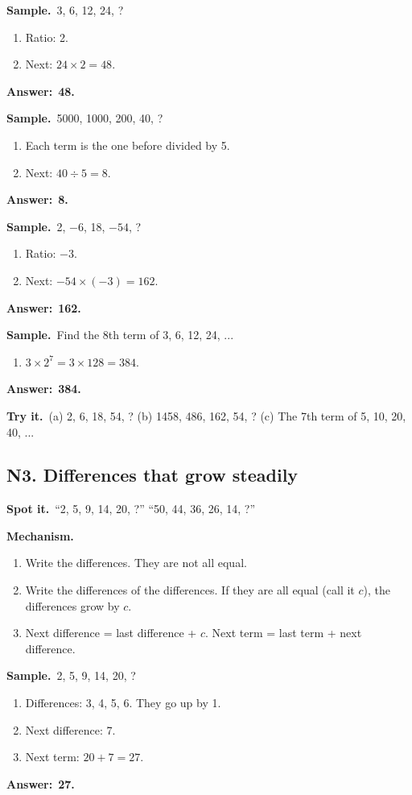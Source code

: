 \documentclass[11pt,a4paper]{article}
\let\oldsubsection\subsection
\renewcommand{\subsection}{\needspace{9\baselineskip}\oldsubsection}
\newcommand{\spot}{\textbf{\color{ember}Spot it.}\ }
\newcommand{\mech}{\textbf{\color{ember}Mechanism.}\ }
\newif\ifkeepsamp
\newcommand{\ans}[1]{\par\nopagebreak\noindent\textbf{\color{ember}Answer:}\ \textbf{#1}\par}
\newcommand{\samp}{\ifkeepsamp\needspace{4\baselineskip}\fi\textbf{\color{ember}Sample.}\ }
\newcommand{\tryit}[1]{\textbf{\color{ember}Try it.}\ #1}
\begin{document}
\samp 3, 6, 12, 24, ?
\begin{enumerate}
\item Ratio: 2.
\item Next: $24 \times 2 = 48$.
\end{enumerate}
\ans{48.}

\samp 5000, 1000, 200, 40, ?
\begin{enumerate}
\item Each term is the one before divided by 5.
\item Next: $40 \div 5 = 8$.
\end{enumerate}
\ans{8.}

\samp 2, $-6$, 18, $-54$, ?
\begin{enumerate}
\item Ratio: $-3$.
\item Next: $-54 \times (-3) = 162$.
\end{enumerate}
\ans{162.}

\samp Find the 8th term of 3, 6, 12, 24, ...
\begin{enumerate}
\item $3 \times 2^{7} = 3 \times 128 = 384$.
\end{enumerate}
\ans{384.}

\tryit (a) 2, 6, 18, 54, ? (b) 1458, 486, 162, 54, ? (c) The 7th term of 5, 10, 20, 40, ...

\subsection{N3. Differences that grow steadily}
\spot ``2, 5, 9, 14, 20, ?'' ``50, 44, 36, 26, 14, ?''

\mech
\begin{enumerate}
\item Write the differences. They are not all equal.
\item Write the differences of the differences. If they are all equal (call it $c$), the differences grow by $c$.
\item Next difference = last difference + $c$. Next term = last term + next difference.
\end{enumerate}

\samp 2, 5, 9, 14, 20, ?
\begin{enumerate}
\item Differences: 3, 4, 5, 6. They go up by 1.
\item Next difference: 7.
\item Next term: $20 + 7 = 27$.
\end{enumerate}
\ans{27.}
\end{document}
